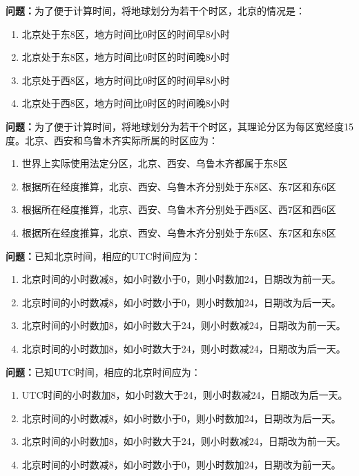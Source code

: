 \bigskip


\noindent\textbf{问题：}为了便于计算时间，将地球划分为若干个时区，北京的情况是：
\begin{enumerate}[label=\Alph*), leftmargin=3em]
\item 北京处于东8区，地方时间比0时区的时间早8小时
\item 北京处于东8区，地方时间比0时区的时间晚8小时
\item 北京处于西8区，地方时间比0时区的时间早8小时
\item 北京处于西8区，地方时间比0时区的时间晚8小时
\end{enumerate}

\bigskip


\noindent\textbf{问题：}为了便于计算时间，将地球划分为若干个时区，其理论分区为每区宽经度15度。北京、西安和乌鲁木齐实际所属的时区应为：
\begin{enumerate}[label=\Alph*), leftmargin=3em]
\item 世界上实际使用法定分区，北京、西安、乌鲁木齐都属于东8区
\item 根据所在经度推算，北京、西安、乌鲁木齐分别处于东8区、东7区和东6区
\item 根据所在经度推算，北京、西安、乌鲁木齐分别处于西8区、西7区和西6区
\item 根据所在经度推算，北京、西安、乌鲁木齐分别处于东6区、东7区和东8区
\end{enumerate}

\bigskip


\noindent\textbf{问题：}已知北京时间，相应的UTC时间应为：
\begin{enumerate}[label=\Alph*), leftmargin=3em]
\item 北京时间的小时数减8，如小时数小于0，则小时数加24，日期改为前一天。
\item 北京时间的小时数减8，如小时数小于0，则小时数加24，日期改为后一天。
\item 北京时间的小时数加8，如小时数大于24，则小时数减24，日期改为前一天。
\item 北京时间的小时数加8，如小时数大于24，则小时数减24，日期改为后一天。
\end{enumerate}

\bigskip


\noindent\textbf{问题：}已知UTC时间，相应的北京时间应为：
\begin{enumerate}[label=\Alph*), leftmargin=3em]
\item UTC时间的小时数加8，如小时数大于24，则小时数减24，日期改为后一天。
\item 北京时间的小时数减8，如小时数小于0，则小时数加24，日期改为后一天。
\item 北京时间的小时数加8，如小时数大于24，则小时数减24，日期改为前一天。
\item 北京时间的小时数减8，如小时数小于0，则小时数加24，日期改为前一天。
\end{enumerate}

